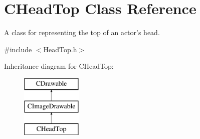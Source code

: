 \hypertarget{class_c_head_top}{\section{C\+Head\+Top Class Reference}
\label{class_c_head_top}
}


A class for representing the top of an actor's head.  




{\ttfamily \#include $<$Head\+Top.\+h$>$}

Inheritance diagram for C\+Head\+Top\+:\begin{figure}[H]
\begin{center}
\leavevmode
\includegraphics[height=3.000000cm]{class_c_head_top}
\end{center}
\end{figure}
